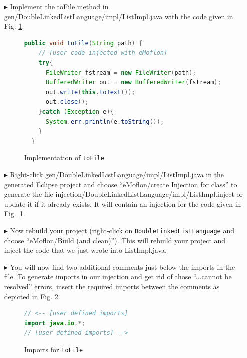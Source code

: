 \begin{enumerate}
  \item[$\blacktriangleright$] Implement the \textsf{toFile} method in \textsf{gen/Double\-Linked\-List\-Language/\-impl/\-ListImpl.java} with the code given in Fig. \ref{code:list_toFile_impl_code}.

\begin{figure}[htbp]
\centering
  \begin{lstlisting}[language=Java, keywordstyle={\bfseries\color{purple}}, backgroundcolor=\color{white}]
  public void toFile(String path) {
    // [user code injected with eMoflon]
    try{
      FileWriter fstream = new FileWriter(path);
      BufferedWriter out = new BufferedWriter(fstream);
      out.write(this.toText());
      out.close();
    }catch (Exception e){
      System.err.println(e.toString());
    }
  }
  \end{lstlisting}
\caption{Implementation of \texttt{toFile}}
\label{code:list_toFile_impl_code}
\end{figure}

  \item[$\blacktriangleright$] Right-click \textsf{gen/Double\-Linked\-List\-Language/\-impl/\-ListImpl.java} in the generated Eclipse project and choose ``eMoflon/create Injection for class'' to generate the file \textsf{injection/DoubleLinkedListLanguage/\-impl/List\-Impl\-.in\-ject} or update it if it already exists.
	It will contain an injection for the code given in Fig.~\ref{code:list_toFile_impl_code}.
  \item[$\blacktriangleright$] Now rebuild your project (right-click on \texttt{DoubleLinkedListLanguage} and choose ``eMoflon/Build (and clean)''). 
  This will rebuild your project and inject the code that we just wrote into \textsf{ListImpl.java}. 
  \item[$\blacktriangleright$] You will now find two additional comments just below the imports in the file. 
  To generate imports in our injection and get rid of those ``...cannot be resolved'' errors, insert the required imports between the comments as depicted in Fig. \ref{code:imports_toFile}.
\begin{figure}[htbp]
\centering
  \begin{lstlisting}[language=Java, keywordstyle={\bfseries\color{purple}}, backgroundcolor=\color{white}]
// <-- [user defined imports]
import java.io.*;
// [user defined imports] -->
  \end{lstlisting}
\caption{Imports for \texttt{toFile}}
\label{code:imports_toFile}
\end{figure}


\end{enumerate}
